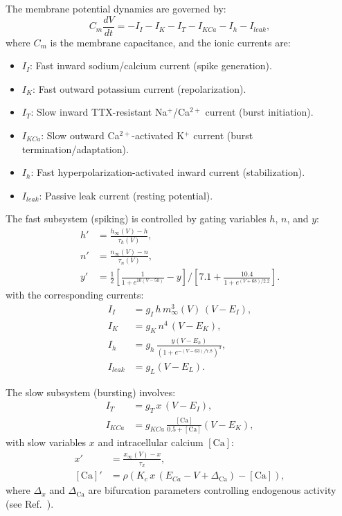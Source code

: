 \documentclass[nofootinbib,aip,amsmath,amssymb,reprint,twocolumn,10pt]{revtex4-2}
\begin{document}
The membrane potential dynamics are governed by:
\begin{equation}
C_m \frac{dV}{dt} = -I_{I} - I_K - I_{T} - I_{KCa} - I_h - I_{leak},
\end{equation}
where $C_m$ is the membrane capacitance, and the ionic currents are:
\begin{itemize}
  \item $I_{I}$: Fast inward sodium/calcium current (spike generation).
  \item $I_K$: Fast outward potassium current (repolarization).
  \item $I_{T}$: Slow inward TTX-resistant Na$^+$/Ca$^{2+}$ current (burst initiation).
  \item $I_{KCa}$: Slow outward Ca$^{2+}$-activated K$^+$ current (burst termination/adaptation).
  \item $I_h$: Fast hyperpolarization-activated inward current (stabilization).
  \item $I_{leak}$: Passive leak current (resting potential).
\end{itemize}

The fast subsystem (spiking) is controlled by gating variables $h$, $n$, and $y$:
\begin{align}
h' &= \frac{h_\infty(V) - h}{\tau_h(V)}, \\
n' &= \frac{n_\infty(V) - n}{\tau_n(V)}, \\
y' &= \frac{1}{2} \left[ \frac{1}{1 + e^{10(V-50)}} - y \right] / \left[ 7.1 + \frac{10.4}{1 + e^{(V+68)/2.2}} \right].
\end{align}
with the corresponding currents:
\begin{align}
I_{I} &= g_{I}\, h\, m_\infty^3(V)\, (V-E_{I}), \\
I_K &= g_K\, n^4\, (V-E_K), \\
I_h &= g_h\, \frac{y (V-E_h)}{(1 + e^{-(V-63)/7.8})^3}, \\
I_{leak} &= g_L (V-E_L).
\end{align}

The slow subsystem (bursting) involves:
\begin{align}
I_{T} &= g_{T}\, x\, (V-E_{I}), \\
I_{KCa} &= g_{KCa}\, \frac{[\mathrm{Ca}]}{0.5 + [\mathrm{Ca}]} (V-E_K),
\end{align}
with slow variables $x$ and intracellular calcium $[\mathrm{Ca}]$:
\begin{align}
x' &= \frac{x_\infty(V) - x}{\tau_x}, \\
[\mathrm{Ca}]' &= \rho \left( K_c\, x\, (E_{Ca} - V + \Delta_{\mathrm{Ca}}) - [\mathrm{Ca}] \right),
\end{align}
where $\Delta_x$ and $\Delta_{\mathrm{Ca}}$ are bifurcation parameters controlling endogenous activity (see Ref.~\cite{scully2024pairing}).
\end{document}
